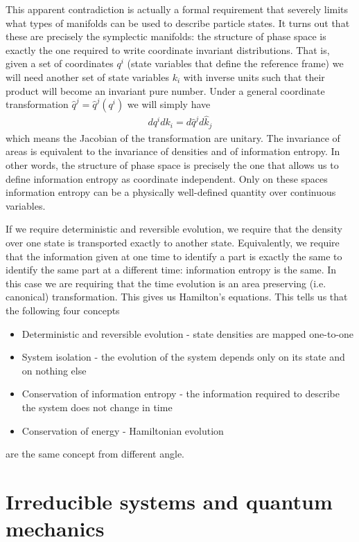 \documentclass{ws-ijqi}
\begin{document}
This apparent contradiction is actually a formal requirement that severely limits what types of manifolds can be used to describe particle states. It turns out that these are precisely the symplectic manifolds: the structure of phase space is exactly the one required to write coordinate invariant distributions. That is, given a set of coordinates $q^i$ (state variables that define the reference frame) we will need another set of state variables $k_i$ with inverse units such that their product will become an invariant pure number. Under a general coordinate transformation $\hat{q}^j = \hat{q}^j (q^i)$ we will simply have 
\begin{equation}
\begin{aligned}
dq^i dk_i = d\hat{q}^j d\hat{k}_j
\end{aligned}
\end{equation}
which means the Jacobian of the transformation are unitary. The invariance of areas is equivalent to the invariance of densities and of information entropy. In other words, the structure of phase space is precisely the one that allows us to define information entropy as coordinate independent. Only on these spaces information entropy can be a physically well-defined quantity over continuous variables.

If we require deterministic and reversible evolution, we require that the density over one state is transported exactly to another state. Equivalently, we require that the information given at one time to identify a part is exactly the same to identify the same part at a different time: information entropy is the same. In this case we are requiring that the time evolution is an area preserving (i.e. canonical) transformation. This gives us Hamilton's equations. This tells us that the following four concepts
\begin{itemize}
	\item Deterministic and reversible evolution - state densities are mapped one-to-one
	\item System isolation - the evolution of the system depends only on its state and on nothing else
	\item Conservation of information entropy - the information required to describe the system does not change in time
	\item Conservation of energy - Hamiltonian evolution
\end{itemize}
are the same concept from different angle.

\section{Irreducible systems and quantum mechanics}
\end{document}
